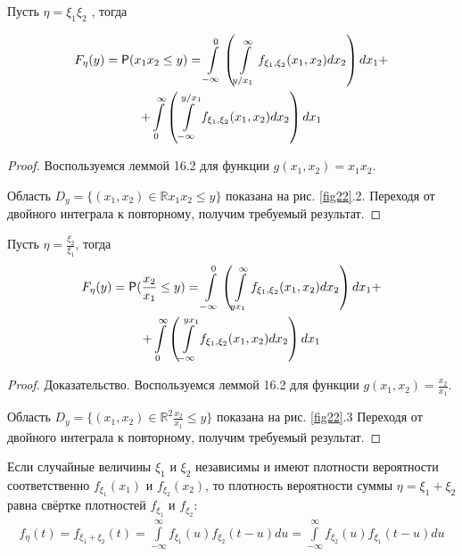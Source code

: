 \begin{lemma}
	
Пусть $\eta = \xi_1 \xi_2$ , тогда

\begin{gather*}
	F_\eta (y) = \P ( x_1x_2 \leq y ) =
	\int\limits_{-\infty}^{0}\left(
		\int\limits_{y/x_1}^{\infty} f_{\xi_1,\xi_2} (x_1, x_2 ) dx_2
	\right)dx_1+\\+
	\int\limits_{0}^{\infty}\left(
		\int\limits^{y/x_1}_{-\infty} f_{\xi_1,\xi_2} (x_1, x_2 ) dx_2
	\right)dx_1
\end{gather*}
\end{lemma}

\begin{proof}
	Воспользуемся леммой 16.2 для функции $g(x_1 , x_2 ) = x_1 x_2$.

Область $D_y = \{(x_1 , x_2 ) \in \mathbb{\mathbb{R}} x_1 x_2 \leq y\}$ показана на рис. \ref{fig22}.2. Переходя от двойного интеграла к повторному, получим требуемый результат.
\end{proof}

\begin{lemma}
Пусть $\eta = \frac{\xi_2}{\xi_1}$, тогда
\begin{gather*}
	F_\eta (y) = \P ( \frac{x_2}{x_1} \leq y ) =
	\int\limits_{-\infty}^{0}\left(
		\int\limits_{yx_1}^{\infty} f_{\xi_1,\xi_2} (x_1, x_2 ) dx_2
	\right)dx_1+\\+
	\int\limits_{0}^{\infty}\left(
		\int\limits^{yx_1}_{-\infty} f_{\xi_1,\xi_2} (x_1, x_2 ) dx_2
	\right)dx_1
\end{gather*}
\end{lemma}
\begin{proof}
Доказательство. Воспользуемся леммой 16.2 для функции $g(x_1 , x_2 ) = \frac{x_2}{x_1}$.

Область $D_y = \{(x_1 , x_2 ) \in \mathbb{R}^2  \frac{x_2}{x_1} \leq y\}$ показана на рис. \ref{fig22}.3 Переходя от двойного интеграла к повторному, получим требуемый результат.
\end{proof}

\begin{lemma}[О свёртке]
	Если случайные величины $\xi_1$ и $\xi_2$ независимы
и имеют плотности вероятности соответственно $f_{\xi_1} (x_1 )$ и $f_{\xi_2} (x_2 )$, то плотность вероятности суммы $\eta = \xi_1 + \xi_2$ равна свёртке плотностей $f_{\xi_1}$ и $f_{\xi_2}$:
\begin{gather*}
	f_\eta (t)=f_{\xi_1+\xi_2}(t)=\int\limits_{-\infty}^{\infty} f_{\xi_1} (u)f_{\xi_2} (t - u) du=
	\int\limits_{-\infty}^{\infty} f_{\xi_2}(u)f_{\xi_1} (t - u) du
\end{gather*}
\end{lemma}


